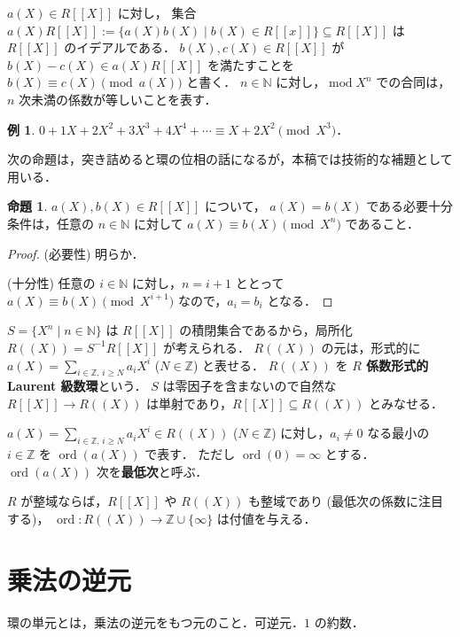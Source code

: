 \documentclass{jsarticle}
\DeclareMathOperator{\Mod}{mod}
\DeclareMathOperator{\ord}{ord}
\newcommand{\N}{\mathbb{N}}
\newcommand{\Z}{\mathbb{Z}}
\newcommand{\longto}{\longrightarrow}
\theoremstyle{definition}
\newtheorem*{Exm}{例}
\newtheorem{Prp}{命題}
\newenvironment{exm}{\begin{leftbar}\begin{Exm}}{\end{Exm}\end{leftbar}}
\newenvironment{prp}{\vspace{1ex}\begin{screen}\begin{Prp}}{\end{Prp}\end{screen}}
\newenvironment{prf}{\begin{leftbar}\begin{proof}}{\end{proof}\end{leftbar}}
\begin{document}
$a(X) \in R[[X]]$ に対し，
集合 $a(X) R[[X]] := \{ a(X) b(X) \mid b(X) \in R[[x]] \} \subseteq R[[X]]$ は
$R[[X]]$ のイデアルである．
$b(X), c(X) \in R[[X]]$ が $b(X) - c(X) \in a(X) R[[X]]$ を満たすことを
$b(X) \equiv c(X) \pmod{a(X)}$ と書く．
$n \in \N$ に対し，$\Mod X^n$ での合同は，$n$ 次未満の係数が等しいことを表す．

\begin{exm}
  $0 + 1 X + 2 X^2 + 3 X^3 + 4 X^4 + \cdots \equiv X + 2 X^2 \pmod{X^3}$．
\end{exm}

次の命題は，突き詰めると環の位相の話になるが，本稿では技術的な補題として用いる．

\begin{prp}
  \label{prp:mod-limit}
  $a(X), b(X) \in R[[X]]$ について，
  $a(X) = b(X)$ である必要十分条件は，任意の $n \in \N$ に対して $a(X) \equiv b(X) \pmod{X^n}$ であること．
\end{prp}
\begin{prf}
  (必要性)
  明らか．

  (十分性)
  任意の $i \in \N$ に対し，$n = i + 1$ ととって $a(X) \equiv b(X) \pmod{X^{i+1}}$ なので，$a_i = b_i$ となる．
\end{prf}

$S = \{ X^n \mid n \in \N \}$ は $R[[X]]$ の積閉集合であるから，局所化 $R((X)) = S^{-1} R[[X]]$ が考えられる．
$R((X))$ の元は，形式的に $a(X) = \sum_{i\in\Z,\,i\ge N} a_i X^i$ ($N \in \Z$) と表せる．
$R((X))$ を \textbf{$R$ 係数形式的 Laurent 級数環}という．
$S$ は零因子を含まないので自然な $R[[X]] \longto R((X))$ は単射であり，$R[[X]] \subseteq R((X))$ とみなせる．

$a(X) = \sum_{i\in\Z,\,i\ge N} a_i X^i \in R((X))$ ($N \in \Z$) に対し，$a_i \ne 0$ なる最小の $i \in \Z$ を $\ord(a(X))$ で表す．
ただし $\ord(0) = \infty$ とする．
$\ord(a(X))$ 次を\textbf{最低次}と呼ぶ．

$R$ が整域ならば，$R[[X]]$ や $R((X))$ も整域であり (最低次の係数に注目する)，
$\ord\colon R((X)) \longto \Z \cup \{\infty\}$ は付値を与える．


\section{乗法の逆元}
環の単元とは，乗法の逆元をもつ元のこと．可逆元．$1$ の約数．
\end{document}
